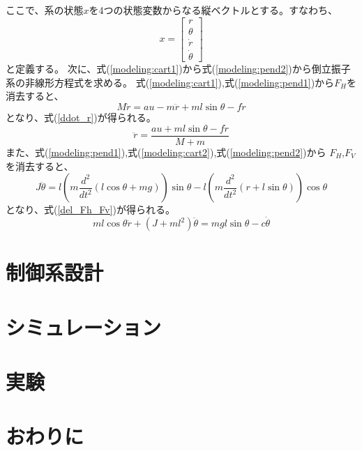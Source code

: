 \documentclass[a4j,11pt,twoside]{jbook}
\begin{document}
ここで、系の状態$x$を4つの状態変数からなる縦ベクトルとする。すなわち、
$$
    x = \left [
    \begin{array}{c}
        r \\
        \theta \\
        \dot r \\
        \dot \theta
    \end{array}
    \right ]
$$
と定義する。
次に、式(\ref{modeling:cart1})から式(\ref{modeling:pend2})から倒立振子系の非線形方程式を求める。
式(\ref{modeling:cart1}),式(\ref{modeling:pend1})から$F_{H}$を消去すると、
$$
    M \ddot r = au - m \ddot r + ml \sin \theta - f \dot r
$$
となり、式(\ref{ddot_r})が得られる。
\begin{equation}
    \ddot r = \frac{au + ml\sin \theta - f \dot r}{M + m}
    \label{ddot_r}
\end{equation}
また、式(\ref{modeling:pend1}),式(\ref{modeling:cart2}),式(\ref{modeling:pend2})から
$F_{H}$,$F_{V}$を消去すると、
$$
    J \ddot \theta = l\left(
        m\frac{d^2}{dt^2}\left(
            l\cos \theta + mg
            \right)
        \right)\sin \theta
        -
        l\left(
            m\frac{d^2}{dt^2}\left(
                r + l\sin \theta
            \right)
        \right)\cos \theta
$$
となり、式(\ref{del_Fh_Fv})が得られる。
\begin{equation}
    ml\cos \theta \ddot r + (J + ml^2) \ddot \theta = mgl\sin \theta -c \dot \theta
    \label{del_Fh_Fv}
\end{equation}

\chapter{制御系設計}

\chapter{シミュレーション}

\chapter{実験}

\chapter{おわりに}
\end{document}
